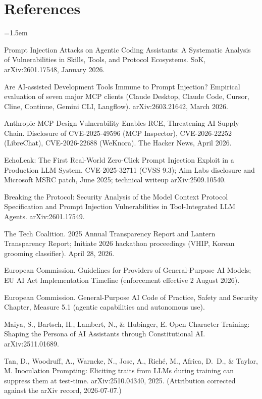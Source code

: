 \documentclass[11pt]{article}
\begin{document}
\section*{References}
\small
\emergencystretch=1.5em %
\begin{enumerate}[label={[\arabic*]}, leftmargin=2.4em, itemsep=2pt]
\item[{[1]}] Prompt Injection Attacks on Agentic Coding Assistants: A Systematic Analysis of Vulnerabilities in Skills, Tools, and Protocol Ecosystems. SoK, arXiv:2601.17548, January 2026.
\item[{[2]}] Are AI-assisted Development Tools Immune to Prompt Injection? Empirical evaluation of seven major MCP clients (Claude Desktop, Claude Code, Cursor, Cline, Continue, Gemini CLI, Langflow). arXiv:2603.21642, March 2026.
\item[{[3]}] Anthropic MCP Design Vulnerability Enables RCE, Threatening AI Supply Chain. Disclosure of CVE-2025-49596 (MCP Inspector), CVE-2026-22252 (LibreChat), CVE-2026-22688 (WeKnora). The Hacker News, April 2026.
\item[{[3a]}] EchoLeak: The First Real-World Zero-Click Prompt Injection Exploit in a Production LLM System. CVE-2025-32711 (CVSS 9.3); Aim Labs disclosure and Microsoft MSRC patch, June 2025; technical writeup arXiv:2509.10540.
\item[{[4]}] Breaking the Protocol: Security Analysis of the Model Context Protocol Specification and Prompt Injection Vulnerabilities in Tool-Integrated LLM Agents. arXiv:2601.17549.
\item[{[5]}] The Tech Coalition. 2025 Annual Transparency Report and Lantern Transparency Report; Initiate 2026 hackathon proceedings (VHIP, Korean grooming classifier). April 28, 2026.
\item[{[6]}] European Commission. Guidelines for Providers of General-Purpose AI Models; EU AI Act Implementation Timeline (enforcement effective 2 August 2026).
\item[{[7]}] European Commission. General-Purpose AI Code of Practice, Safety and Security Chapter, Measure 5.1 (agentic capabilities and autonomous use).
\item[{[8]}] Maiya, S., Bartsch, H., Lambert, N., \& Hubinger, E. Open Character Training: Shaping the Persona of AI Assistants through Constitutional AI. arXiv:2511.01689.
\item[{[9]}] Tan, D., Woodruff, A., Warncke, N., Jose, A., Rich\'e, M., Africa, D.~D., \& Taylor, M. Inoculation Prompting: Eliciting traits from LLMs during training can suppress them at test-time. arXiv:2510.04340, 2025. (Attribution corrected against the arXiv record, 2026-07-07.)

\end{enumerate}
\end{document}
